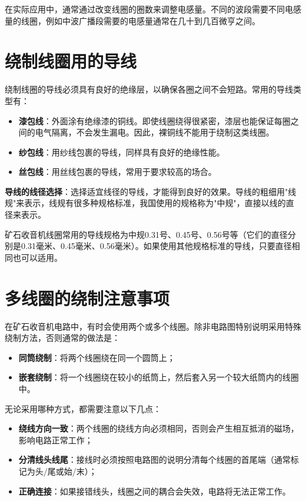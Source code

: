 \documentclass[12pt,UTF8]{ctexbook}
\begin{document}
在实际应用中，通常通过改变线圈的圈数来调整电感量。不同的波段需要不同电感量的线圈，例如中波广播段需要的电感量通常在几十到几百微亨之间。

\section{绕制线圈用的导线}

绕制线圈的导线必须具有良好的绝缘层，以确保各圈之间不会短路。常用的导线类型有：

\begin{itemize}
	\item \textbf{漆包线}：外面涂有绝缘漆的铜线。即使线圈绕得很紧密，漆层也能保证每圈之间的电气隔离，不会发生漏电。因此，裸铜线不能用于绕制这类线圈。
	\item \textbf{纱包线}：用纱线包裹的导线，同样具有良好的绝缘性能。
	\item \textbf{丝包线}：用丝线包裹的导线，常用于要求较高的场合。
\end{itemize}

\textbf{导线的线径选择}：选择适宜线径的导线，才能得到良好的效果。导线的粗细用"线规"来表示，线规有很多种规格标准，我国使用的规格称为"中规"，直接以线的直径来表示。

矿石收音机线圈常用的导线规格为中规0.31号、0.45号、0.56号等（它们的直径分别是0.31毫米、0.45毫米、0.56毫米）。如果使用其他规格标准的导线，只要直径相同也可以适用。

\section{多线圈的绕制注意事项}

在矿石收音机电路中，有时会使用两个或多个线圈。除非电路图特别说明采用特殊绕制方法，否则通常的做法是：

\begin{itemize}
	\item \textbf{同筒绕制}：将两个线圈绕在同一个圆筒上；
	\item \textbf{嵌套绕制}：将一个线圈绕在较小的纸筒上，然后套入另一个较大纸筒内的线圈中。
\end{itemize}

无论采用哪种方式，都需要注意以下几点：
\begin{itemize}
	\item \textbf{绕线方向一致}：两个线圈的绕线方向必须相同，否则会产生相互抵消的磁场，影响电路正常工作；
	\item \textbf{分清线头线尾}：接线时必须按照电路图的说明分清每个线圈的首尾端（通常标记为头/尾或始/末）；
	\item \textbf{正确连接}：如果接错线头，线圈之间的耦合会失效，电路将无法正常工作。
\end{itemize}
\end{document}
